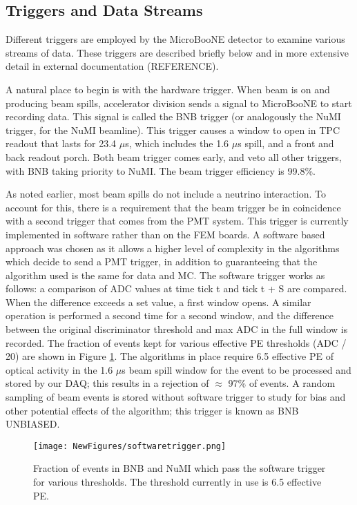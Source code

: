 \documentclass[12pt]{article}
\begin{document}
\subsection{Triggers and Data Streams}
\par Different triggers are employed by the MicroBooNE detector to examine various streams of data. These triggers are described briefly below and in more extensive detail in external documentation (REFERENCE).
\par A natural place to begin is with the hardware trigger.  When beam is on and producing beam spills, accelerator division sends a signal to MicroBooNE to start recording data. This signal is called the BNB trigger (or analogously the NuMI trigger, for the NuMI beamline).  This trigger causes a window to open in TPC readout that lasts for 23.4 $\mu$s, which includes the 1.6 $\mu$s spill, and a front and back readout porch.  Both beam trigger comes early, and veto all other triggers, with BNB taking priority to NuMI.  The beam trigger efficiency is 99.8\%. %
\par As noted earlier, most beam spills do not include a neutrino interaction. To account for this, there is a requirement that the beam trigger be in coincidence with a second trigger that comes from the PMT system. This trigger is currently implemented in software rather than on the FEM boards.  A software based approach was chosen as it allows a higher level of complexity in the algorithms which decide to send a PMT trigger, in addition to guaranteeing that the algorithm used is the same for data and MC.  The software trigger works as follows: a comparison of ADC values at time tick t and tick t + S are compared.  When the difference exceeds a set value, a first window opens. A similar operation is performed a second time for a second window, and the difference between the original discriminator threshold and max ADC in the full window is recorded. The fraction of events kept for various effective PE thresholds (ADC / 20) are shown in Figure \ref{fig:swtrigger}.  The algorithms in place require 6.5 effective PE of optical activity in the 1.6 $\mu$s beam spill window for the event to be processed and stored by our DAQ; this results in a rejection of $\approx$ 97\% of events. A random sampling of beam events is stored without software trigger to study for bias and other potential effects of the algorithm; this trigger is known as BNB UNBIASED. 

\begin{figure}[h!]
\centering
\texttt{[image: NewFigures/softwaretrigger.png]}
\caption{ Fraction of events in BNB and NuMI which pass the software trigger for various thresholds. The threshold currently in use is 6.5 effective PE.  } 
\label{fig:swtrigger}
\end{figure}
\end{document}
